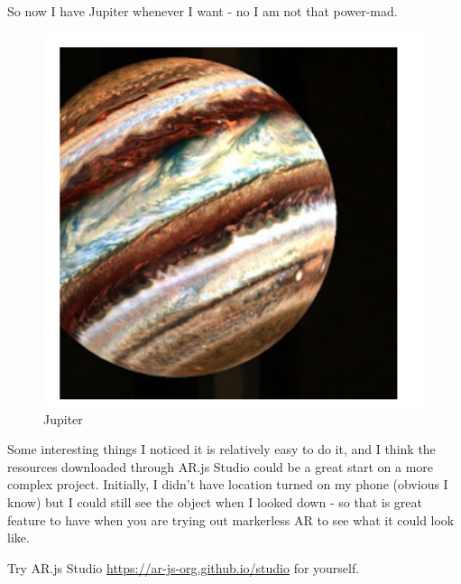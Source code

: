 So now I have Jupiter whenever I want - no I am not that power-mad.
 \begin{figure}
     \centering
     \includegraphics{chapters/ChapterAR/webar4.png}
     \caption{Jupiter}
     \label{fig:jupiter}
 \end{figure}
 
 Some interesting things I noticed it is relatively easy to do it, and I think the resources downloaded through AR.js Studio could be a great start on a more complex project. Initially, I didn't have location turned on my phone (obvious I know) but I could still see the object when I looked down - so that is great feature to have when you are trying out markerless AR to see what it could look like. 

Try AR.js Studio \url{https://ar-js-org.github.io/studio} for yourself.
